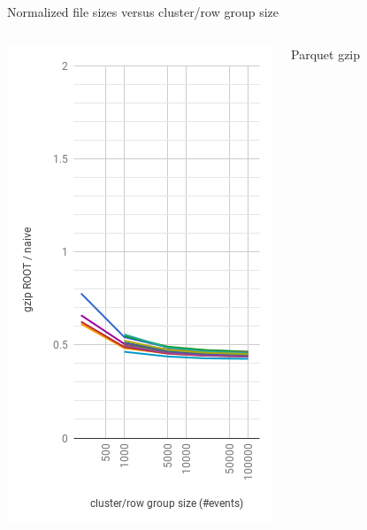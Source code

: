 \documentclass[aspectratio=169]{beamer}
\begin{document}
\begin{frame}{Normalized file sizes versus cluster/row group size}
\begin{columns}
\begin{center}
\includegraphics[width=\linewidth]{root-gzip.png}
\end{center}
\begin{center}
\normalsize Parquet gzip


\end{center}
\end{columns}
\end{frame}
\end{document}
